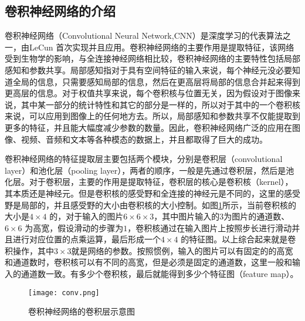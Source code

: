 \subsection{卷积神经网络的介绍}
卷积神经网络（Convolutional Neural Network,CNN）是深度学习的代表算法之一，由LeCun 首次实现并且应用。卷积神经网络的主要作用是提取特征，该网络受到生物学的影响，与全连接神经网络相比较，卷积神经网络的主要特性包括局部感知和参数共享。局部感知指对于具有空间特征的输入来说，每个神经元没必要知道全局的信息，只需要感知局部的信息，然后在更高层将局部的信息合并起来得到更高层的信息。对于权值共享来说，每个卷积核与位置无关，因为假设对于图像来说，其中某一部分的统计特性和其它的部分是一样的，所以对于其中的一个卷积核来说，可以应用到图像上的任何地方去。所以，局部感知和参数共享不仅能提取到更多的特征，并且能大幅度减少参数的数量。因此，卷积神经网络广泛的应用在图像、视频、音频和文本等各种模态的数据上，并且都取得了巨大的成功。

卷积神经网络的特征提取层主要包括两个模块，分别是卷积层（convolutional layer）和池化层（pooling layer），两者的顺序，一般是先通过卷积层，然后是池化层。对于卷积层，主要的作用是提取特征，卷积层的核心是卷积核（kernel），其本质还是神经元。但是卷积核的感受野和全连接的神经元是不同的，这里的感受野是局部的，并且感受野的大小由卷积核的大小控制。如图\ref{fig:conv-example}所示，当前卷积核的大小是$4 \times 4$ 的，对于输入的图片$6 \times 6 \times 3$，其中图片输入的3为图片的通道数、$6 \times 6$ 为高宽，假设滑动的步骤为$1$，卷积核通过在输入图片上按照步长进行滑动并且进行对应位置的点乘运算，最后形成一个$4 \times 4$ 的特征图。以上综合起来就是卷积操作，其中$3 \times 3$就是网络的参数。按照惯例，输入的图片可以有固定的的高宽和通道数时，卷积核可以有不同的高宽，但是必须是固定的通道数，这里一般和输入的通道数一致。有多少个卷积核，最后就能得到多少个特征图（feature map）。
\begin{figure}[htpb]
	\centering
	\texttt{[image: conv.png]}
    \caption{卷积神经网络的卷积层示意图}
	\vspace*{-3.5mm}
	\label{fig:conv-example}
\end{figure}

